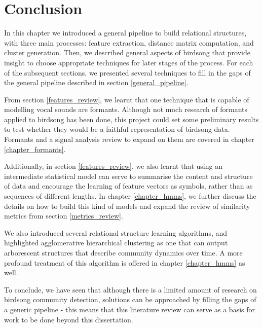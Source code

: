 \documentclass[../main.tex]{subfiles} \label{chapter_soa}
\begin{document}
\section{Conclusion}
In this chapter we introduced a general pipeline to build relational structures, with three main processes: feature extraction, distance matrix computation, and cluster generation. Then, we described general aspects of birdsong that provide insight to choose appropriate techniques for later stages of the process. For each of the subsequent sections, we presented several techniques to fill in the gaps of the general pipeline described in section \ref{general_pipeline}.
\par From section \ref{features_review}, we learnt that one technique that is capable of modelling vocal sounds are formants. Although not much research of formants applied to birdsong has been done, this project could set some preliminary results to test whether they would be a faithful representation of birdsong data. Formants and a signal analysis review to expand on them are covered in chapter \ref{chapter_formants}.
\par Additionally, in section \ref{features_review}, we also learnt that using an intermediate statistical model can serve to summarise the content and structure of data and encourage the learning of feature vectors as symbols, rather than as sequences of different lengths. In chapter \ref{chapter_hmms}, we further discuss the details on how to build this kind of models and expand the review of similarity metrics from section \ref{metrics_review}.
\par We also introduced several relational structure learning algorithms, and highlighted agglomerative hierarchical clustering as one that can output arborescent structures that describe community dynamics over time. A more profound treatment of this algorithm is offered in chapter \ref{chapter_hmms} as well. 
\par To conclude, we have seen that although there is a limited amount of research on birdsong community detection, solutions can be approached by filling the gaps of a generic pipeline - this means that this literature review can serve as a basis for work to be done beyond this dissertation.
\end{document}
